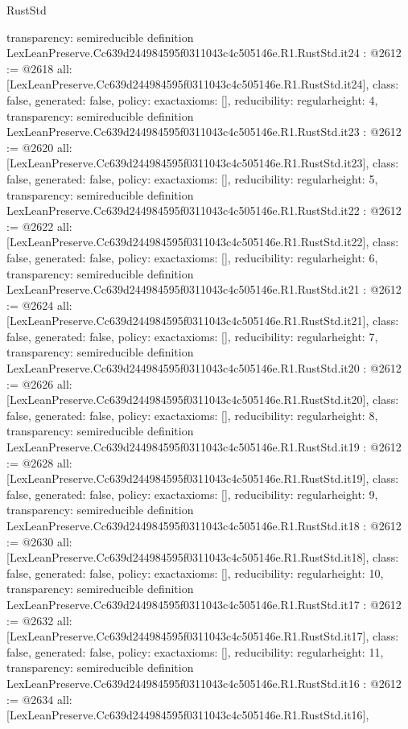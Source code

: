 \begin{lexlean}{RustStd}
\begin{coremodule}
{  transparency: semireducible
}
definition LexLeanPreserve.Cc639d244984595f0311043c4c505146e.R1.RustStd.it24 : @2612 := @2618 {
  all: [LexLeanPreserve.Cc639d244984595f0311043c4c505146e.R1.RustStd.it24],
  class: false,
  generated: false,
  policy: exact{axioms: []},
  reducibility: regular{height: 4},
  transparency: semireducible
}
definition LexLeanPreserve.Cc639d244984595f0311043c4c505146e.R1.RustStd.it23 : @2612 := @2620 {
  all: [LexLeanPreserve.Cc639d244984595f0311043c4c505146e.R1.RustStd.it23],
  class: false,
  generated: false,
  policy: exact{axioms: []},
  reducibility: regular{height: 5},
  transparency: semireducible
}
definition LexLeanPreserve.Cc639d244984595f0311043c4c505146e.R1.RustStd.it22 : @2612 := @2622 {
  all: [LexLeanPreserve.Cc639d244984595f0311043c4c505146e.R1.RustStd.it22],
  class: false,
  generated: false,
  policy: exact{axioms: []},
  reducibility: regular{height: 6},
  transparency: semireducible
}
definition LexLeanPreserve.Cc639d244984595f0311043c4c505146e.R1.RustStd.it21 : @2612 := @2624 {
  all: [LexLeanPreserve.Cc639d244984595f0311043c4c505146e.R1.RustStd.it21],
  class: false,
  generated: false,
  policy: exact{axioms: []},
  reducibility: regular{height: 7},
  transparency: semireducible
}
definition LexLeanPreserve.Cc639d244984595f0311043c4c505146e.R1.RustStd.it20 : @2612 := @2626 {
  all: [LexLeanPreserve.Cc639d244984595f0311043c4c505146e.R1.RustStd.it20],
  class: false,
  generated: false,
  policy: exact{axioms: []},
  reducibility: regular{height: 8},
  transparency: semireducible
}
definition LexLeanPreserve.Cc639d244984595f0311043c4c505146e.R1.RustStd.it19 : @2612 := @2628 {
  all: [LexLeanPreserve.Cc639d244984595f0311043c4c505146e.R1.RustStd.it19],
  class: false,
  generated: false,
  policy: exact{axioms: []},
  reducibility: regular{height: 9},
  transparency: semireducible
}
definition LexLeanPreserve.Cc639d244984595f0311043c4c505146e.R1.RustStd.it18 : @2612 := @2630 {
  all: [LexLeanPreserve.Cc639d244984595f0311043c4c505146e.R1.RustStd.it18],
  class: false,
  generated: false,
  policy: exact{axioms: []},
  reducibility: regular{height: 10},
  transparency: semireducible
}
definition LexLeanPreserve.Cc639d244984595f0311043c4c505146e.R1.RustStd.it17 : @2612 := @2632 {
  all: [LexLeanPreserve.Cc639d244984595f0311043c4c505146e.R1.RustStd.it17],
  class: false,
  generated: false,
  policy: exact{axioms: []},
  reducibility: regular{height: 11},
  transparency: semireducible
}
definition LexLeanPreserve.Cc639d244984595f0311043c4c505146e.R1.RustStd.it16 : @2612 := @2634 {
  all: [LexLeanPreserve.Cc639d244984595f0311043c4c505146e.R1.RustStd.it16],
}
\end{coremodule}
\end{lexlean}

